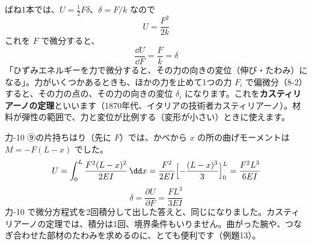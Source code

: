 ばね1本では、$U=\tfrac{1}{2}F\delta$、$\delta=F/k$ なので
\[U=\frac{F^2}{2k}\]
これを $F$ で微分すると、
\[ \frac{\dd U}{\dd F}=\frac{F}{k}=\delta \]
「ひずみエネルギーを力で微分すると、その力の向きの変位（伸び・たわみ）になる」。力がいくつかあるときも、ほかの力を止めて1つの力 $F_i$ で偏微分（8-2）すると、その力の点の、その力の向きの変位 $\delta_i$ になります。これを\textbf{カスティリアーノの定理}といいます（1870年代、イタリアの技術者カスティリアーノ）。材料が弾性の範囲で、力と変位が比例する（変形が小さい）ときに使えます。
\label{ph:力-11:casti}

力-10 ⑨の片持ちはり（先に $F$）では、かべから $x$ の所の曲げモーメントは $M=-F(L-x)$ でした。
\[ U=\int_0^L\frac{F^2(L-x)^2}{2EI}\,\dd x=\frac{F^2}{2EI}\Bigl[-\frac{(L-x)^3}{3}\Bigr]_0^L=\frac{F^2L^3}{6EI} \]
\[ \delta=\frac{\partial U}{\partial F}=\frac{FL^3}{3EI} \]
力-10 で微分方程式を2回積分して出した答えと、同じになりました。カスティリアーノの定理では、積分は1回、境界条件もいりません。曲がった腕や、つなぎ合わせた部材のたわみを求めるのに、とても便利です（例題13）。

\begin{phflow}
\end{phflow}


